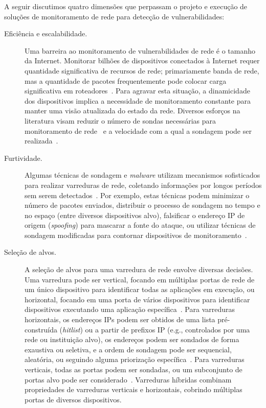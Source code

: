 A seguir discutimos quatro dimensões que perpassam o projeto e execução de soluções de monitoramento de rede para detecção de vulnerabilidades:

\begin{description}

  \item[Eficiência e escalabilidade.] Uma barreira ao monitoramento de vulnerabilidades de rede é o tamanho da Internet. Monitorar bilhões de dispositivos conectados à Internet requer quantidade significativa de recursos de rede; primariamente banda de rede, mas a quantidade de pacotes frequentemente pode colocar carga significativa em roteadores~\cite{beverly10hifreq, cunha14dtrack}. Para agravar esta situação, a dinamicidade dos dispositivos implica a necessidade de monitoramento constante para manter uma visão atualizada do estado da rede. Diversos esforços na literatura visam reduzir o número de sondas necessárias para monitoramento de rede~\cite{beverly10hifreq, luckie13speedtrap, xia2005efficient, you2019profuzzer} e a velocidade com a qual a sondagem pode ser realizada~\cite{durumeric2013zmap, durumeric2015search}.

  \item[Furtividade.] Algumas técnicas de sondagem e \emph{malware} utilizam mecanismos sofisticados para realizar varreduras de rede, coletando informações por longos períodos sem serem detectados~\cite{staniford2002practical, stojanovic2020apt}.  Por exemplo, estas técnicas podem minimizar o número de pacotes enviados, distribuir o processo de sondagem no tempo e no espaço (entre diversos dispositivos alvo), falsificar o endereço IP de origem (\emph{spoofing}) para mascarar a fonte do ataque, ou utilizar técnicas de sondagem modificadas para contornar dispositivos de monitoramento~\cite{dainotti2012analysis}.

  \item[Seleção de alvos.] A seleção de alvos para uma varredura de rede envolve diversas decisões. Uma varredura pode ser vertical, focando em múltiplas portas de rede de um único dispositivo para identificar todas as aplicações em execução, ou horizontal, focando em uma porta de vários dispositivos para identificar dispositivos executando uma aplicação específica~\cite{barnett2008towards}. Para varreduras horizontais, os endereços IPs podem ser obtidos de uma lista pré-construída (\emph{hitlist}) ou a partir de prefixos IP (e.g., controlados por uma rede ou instituição alvo), os endereços podem ser sondados de forma exaustiva ou seletiva, e a ordem de sondagem pode ser sequencial, aleatória, ou seguindo alguma priorização específica~\cite{achleitner2016cyber}. Para varreduras verticais, todas as portas podem ser sondadas, ou um subconjunto de portas alvo pode ser considerado~\cite{abu2006multifaceted}. Varreduras híbridas combinam propriedades de varreduras verticais e horizontais, cobrindo múltiplas portas de diversos dispositivos.


\end{description}
